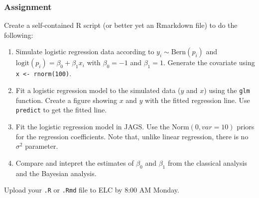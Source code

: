 \documentclass[color=usenames,dvipsnames]{beamer}\usepackage[]{graphicx}\usepackage[]{xcolor}
\newcommand{\inr}[1]{\colorbox{inlinecolor}{\texttt{#1}}}
\begin{document}
\begin{frame}
  \frametitle{Assignment}
  \small
  Create a self-contained R script (or better yet an Rmarkdown file)
  to do the following:
  \begin{enumerate}
    \small
    \item Simulate logistic regression data according to
      $y_i \sim \mathrm{Bern}(p_i)$ and $\mathrm{logit}(p_i) = \beta_0
      + \beta_1 x_i$ with $\beta_0=-1$ and $\beta_1=1$. Generate the
      covariate using \inr{x <- rnorm(100)}.
    \item Fit a logistic regression model to the simulated data ($y$
      and $x$) using the \inr{glm} function. Create a figure showing
      $x$ and $y$ with the fitted regression line. Use
      \inr{predict} to get the fitted line.
    \item Fit the logistic regression model in JAGS. Use the
      $\mathrm{Norm}(0, var=10)$ priors for the regression
      coefficients. Note that, unlike linear regression, there is no
      $\sigma^2$ parameter.
    \item Compare and intepret the estimates of $\beta_0$ and
      $\beta_1$ from the classical analysis and the Bayesian analysis.
  \end{enumerate}
  Upload your {\tt .R} or {\tt .Rmd} file to ELC by 8:00 AM Monday.
\end{frame}
\end{document}
